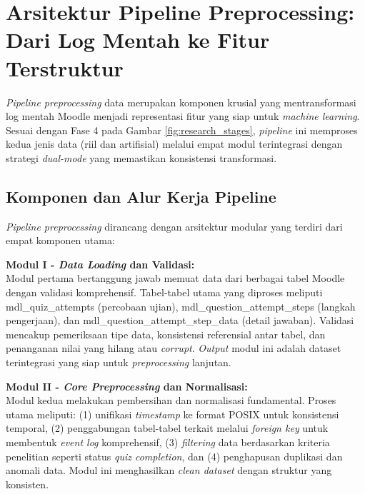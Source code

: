 \section{Arsitektur Pipeline Preprocessing: Dari Log Mentah ke Fitur Terstruktur}
\label{sec:pipelinePreprocessing}
\textit{Pipeline preprocessing} data merupakan komponen krusial yang mentransformasi log mentah Moodle menjadi representasi fitur yang siap untuk \textit{machine learning}. Sesuai dengan Fase 4 pada Gambar \ref{fig:research_stages}, \textit{pipeline} ini memproses kedua jenis data (riil dan artifisial) melalui empat modul terintegrasi dengan strategi \textit{dual-mode} yang memastikan konsistensi transformasi.

\subsection{Komponen dan Alur Kerja Pipeline}
\label{sec:komponenPipeline}

\textit{Pipeline preprocessing} dirancang dengan arsitektur modular yang terdiri dari empat komponen utama:

\textbf{Modul I - \textit{Data Loading} dan Validasi:} \\
Modul pertama bertanggung jawab memuat data dari berbagai tabel Moodle dengan validasi komprehensif. Tabel-tabel utama yang diproses meliputi mdl\_quiz\_attempts (percobaan ujian), mdl\_question\_attempt\_steps (langkah pengerjaan), dan mdl\_question\_attempt\_step\_data (detail jawaban). Validasi mencakup pemeriksaan tipe data, konsistensi referensial antar tabel, dan penanganan nilai yang hilang atau \textit{corrupt}. \textit{Output} modul ini adalah dataset terintegrasi yang siap untuk \textit{preprocessing} lanjutan.

\textbf{Modul II - \textit{Core Preprocessing} dan Normalisasi:} \\
Modul kedua melakukan pembersihan dan normalisasi fundamental. Proses utama meliputi: (1) unifikasi \textit{timestamp} ke format POSIX untuk konsistensi temporal, (2) penggabungan tabel-tabel terkait melalui \textit{foreign key} untuk membentuk \textit{event log} komprehensif, (3) \textit{filtering} data berdasarkan kriteria penelitian seperti status \textit{quiz completion}, dan (4) penghapusan duplikasi dan anomali data. Modul ini menghasilkan \textit{clean dataset} dengan struktur yang konsisten.

